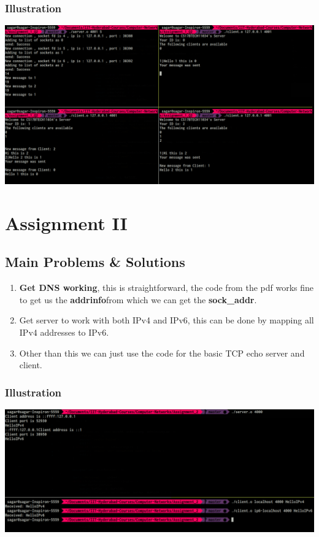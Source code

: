 \documentclass[a4paper,12pt]{report}
\begin{document}
\subsubsection{Illustration}
\begin{center}
\includegraphics[scale=0.25]{a1q2.png}
\end{center}
\section{Assignment II}
\subsection{Main Problems \& Solutions}
\begin{enumerate}
\item \textbf{Get DNS working}, this is straightforward, the code from the pdf works fine to get us the \textbf{addrinfo}from which we can get the \textbf{sock\_addr}.
\item Get server to work with both IPv4 and IPv6, this can be done by mapping all IPv4 addresses to IPv6.
\item Other than this we can just use the code for the basic TCP echo server and client.
\end{enumerate}
\subsubsection{Illustration}
\begin{center}
\includegraphics[scale=0.25]{a2.png}
\end{center}
\end{document}

